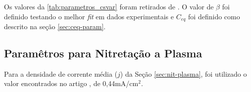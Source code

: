 Os valores da \autoref{tab:parametros_csvar} foram retirados de \cite{christiansen2008nitrogen}. O valor de $\beta$ foi definido testando o melhor \textit{fit} em dados experimentais e $C_{eq}$ foi definido como descrito na seção \autoref{sec:ceq-param}.


\subsection{Paramêtros para Nitretação a Plasma}
\label{sec:param-plasma}

Para a densidade de corrente média ($j$) da Seção \ref{sec:nit-plasma}, foi utilizado o valor encontrados no artigo \cite{galdikas2011modeling}, de 0,44mA/cm$^{2}$. 

